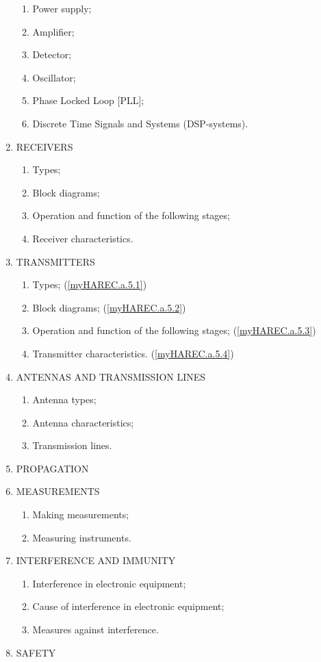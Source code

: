 \begin{enumerate}
\begin{enumerate}[noitemsep]
\item Power supply; \label{HAREC.a.3.3}
\item Amplifier; \label{HAREC.a.3.4}
\item Detector; \label{HAREC.a.3.5}
\item Oscillator; \label{HAREC.a.3.6}
\item Phase Locked Loop [PLL]; \label{HAREC.a.3.7}
\item Discrete Time Signals and Systems (DSP-systems). \label{HAREC.a.3.8}
\end{enumerate}
\item RECEIVERS
\begin{enumerate}[noitemsep]
\item Types; \label{HAREC.a.4.1}
\item Block diagrams; \label{HAREC.a.4.2}
\item Operation and function of the following stages; \label{HAREC.a.4.3}
\item Receiver characteristics. \label{HAREC.a.4.4}
\end{enumerate}
\item TRANSMITTERS
\begin{enumerate}[noitemsep]
\item Types; (\ref{myHAREC.a.5.1})\label{HAREC.a.5.1}
\item Block diagrams; (\ref{myHAREC.a.5.2})\label{HAREC.a.5.2}
\item Operation and function of the following stages; (\ref{myHAREC.a.5.3})\label{HAREC.a.5.3}
\item Transmitter characteristics. (\ref{myHAREC.a.5.4})\label{HAREC.a.5.4}
\end{enumerate}
\item ANTENNAS AND TRANSMISSION LINES
\begin{enumerate}[noitemsep]
\item Antenna types;
\item Antenna characteristics;
\item Transmission lines.
\end{enumerate}
\item PROPAGATION
\item MEASUREMENTS
\begin{enumerate}[noitemsep]
\item Making measurements;
\item Measuring instruments.
\end{enumerate}
\item INTERFERENCE AND IMMUNITY
\begin{enumerate}[noitemsep]
\item Interference in electronic equipment;
\item Cause of interference in electronic equipment;
\item Measures against interference.
\end{enumerate}
\item SAFETY
\end{enumerate}